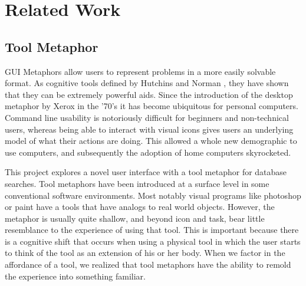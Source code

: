 \documentclass{article}
\begin{document}
%
%
%
%
%
%
\section{Related Work} 
\subsection{Tool Metaphor}

GUI Metaphors allow users to represent problems in a more easily solvable format.  As cognitive tools defined by Hutchins \cite{Hutchins1995} and Norman \cite{Norman1991}, they have shown that they can be extremely powerful aids.  Since the introduction of the desktop metaphor by Xerox in the '70's  it has become ubiquitous for personal computers.  Command line usability is notoriously difficult for beginners and non-technical users, whereas being able to interact with visual icons gives users an underlying model of what their actions are doing.  This allowed a whole new demographic to use computers, and subsequently the adoption of home computers skyrocketed.  

This project explores a novel user interface with a tool metaphor for database searches.  Tool metaphors have been introduced at a surface level in some conventional software environments.  Most notably visual programs like photoshop or paint have a tools that have analogs to real world objects.  However, the metaphor is usually quite shallow, and beyond icon and task, bear little resemblance to the experience of using that tool.  This is important because there is a cognitive shift that occurs when using a physical tool in which the user starts to think of the tool as an extension of his or her body.  \cite{Maravita2004}  When we factor in the affordance of a tool, we realized that tool metaphors have the ability to remold the experience into something familiar.  
\end{document}
